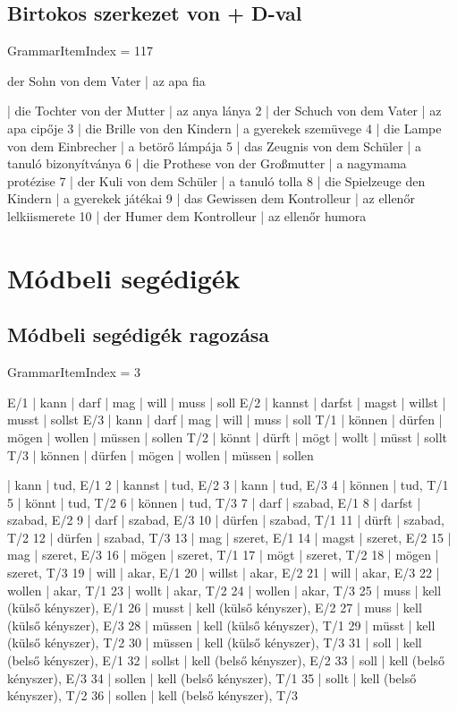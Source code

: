 \documentclass{article}
\newenvironment{desc}{\verbatim}{\endverbatim}
\newenvironment{exmp}{\verbatim}{\endverbatim}
\begin{document}
\subsection{Birtokos szerkezet von + D-val}

GrammarItemIndex = 117

\begin{desc}
der Sohn von dem Vater | az apa fia
\end{desc}

\begin{exmp}
1 | die Tochter von der Mutter | az anya lánya
2 | der Schuch von dem Vater | az apa cipője
3 | die Brille von den Kindern | a gyerekek szemüvege
4 | die Lampe von dem Einbrecher | a betörő lámpája
5 | das Zeugnis von dem Schüler | a tanuló bizonyítványa
6 | die Prothese von der Großmutter | a nagymama protézise
7 | der Kuli von dem Schüler | a tanuló tolla
8 | die Spielzeuge den Kindern | a gyerekek játékai
9 | das Gewissen dem Kontrolleur | az ellenőr lelkiismerete
10 | der Humer dem Kontrolleur | az ellenőr humora
\end{exmp}

\section{Módbeli segédigék}

\subsection{Módbeli segédigék ragozása}

GrammarItemIndex = 3

\begin{desc}
E/1 | kann   | darf   | mag   | will   | muss   | soll 
E/2 | kannst | darfst | magst | willst | musst  | sollst 
E/3 | kann   | darf   | mag   | will   | muss   | soll 
T/1 | können | dürfen | mögen | wollen | müssen | sollen 
T/2 | könnt  | dürft  | mögt  | wollt  | müsst  | sollt 
T/3 | können | dürfen | mögen | wollen | müssen | sollen 
\end{desc}

\begin{exmp}
1 | kann | tud, E/1
2 | kannst | tud, E/2
3 | kann | tud, E/3
4 | können | tud, T/1
5 | könnt | tud, T/2
6 | können | tud, T/3
7 | darf | szabad, E/1
8 | darfst | szabad, E/2
9 | darf | szabad, E/3
10 | dürfen | szabad, T/1
11 | dürft | szabad, T/2
12 | dürfen | szabad, T/3
13 | mag | szeret, E/1
14 | magst | szeret, E/2
15 | mag | szeret, E/3
16 | mögen | szeret, T/1
17 | mögt | szeret, T/2
18 | mögen | szeret, T/3
19 | will | akar, E/1
20 | willst | akar, E/2
21 | will | akar, E/3
22 | wollen | akar, T/1
23 | wollt | akar, T/2
24 | wollen | akar, T/3
25 | muss | kell (külső kényszer), E/1
26 | musst | kell (külső kényszer), E/2
27 | muss | kell (külső kényszer), E/3
28 | müssen | kell (külső kényszer), T/1
29 | müsst | kell (külső kényszer), T/2
30 | müssen | kell (külső kényszer), T/3
31 | soll | kell (belső kényszer), E/1
32 | sollst | kell (belső kényszer), E/2
33 | soll | kell (belső kényszer), E/3
34 | sollen | kell (belső kényszer), T/1
35 | sollt | kell (belső kényszer), T/2
36 | sollen | kell (belső kényszer), T/3
\end{exmp}
\end{document}
